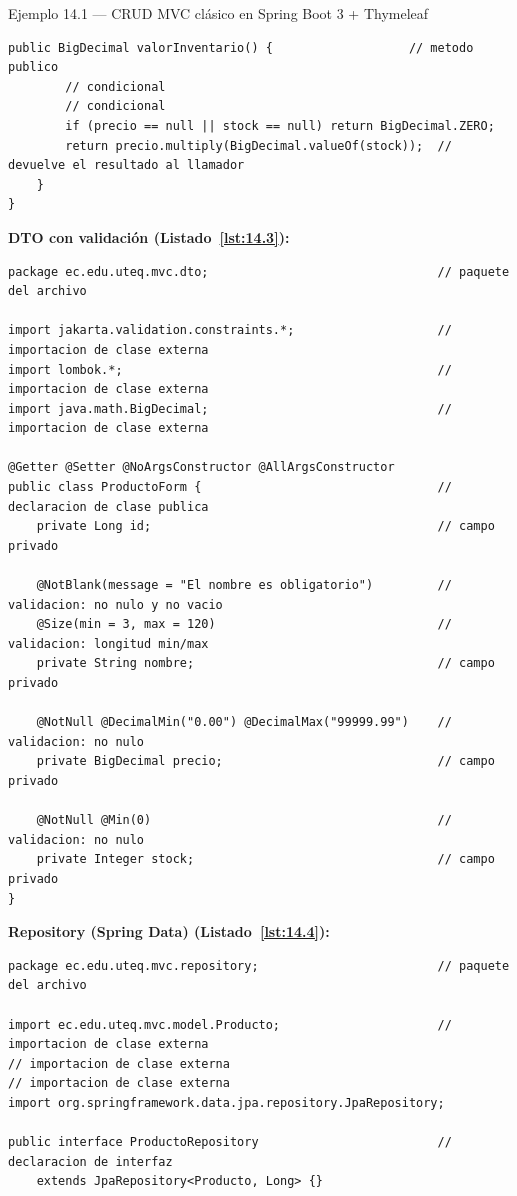 \documentclass[11pt,a4paper,openany]{book}
\begin{document}
\begin{cajaejemplo}{Ejemplo 14.1 --- CRUD MVC clásico en Spring Boot 3 + Thymeleaf}
\begin{lstlisting}[style=java,caption={Producto.java},label=lst:14.2]
    public BigDecimal valorInventario() {                   // metodo publico
        // condicional
        // condicional
        if (precio == null || stock == null) return BigDecimal.ZERO;
        return precio.multiply(BigDecimal.valueOf(stock));  // devuelve el resultado al llamador
    }
}
\end{lstlisting}

\textbf{DTO con validación (Listado~\ref{lst:14.3}):}
\begin{lstlisting}[style=java,caption={ProductoForm.java},label=lst:14.3]
package ec.edu.uteq.mvc.dto;                                // paquete del archivo

import jakarta.validation.constraints.*;                    // importacion de clase externa
import lombok.*;                                            // importacion de clase externa
import java.math.BigDecimal;                                // importacion de clase externa

@Getter @Setter @NoArgsConstructor @AllArgsConstructor
public class ProductoForm {                                 // declaracion de clase publica
    private Long id;                                        // campo privado

    @NotBlank(message = "El nombre es obligatorio")         // validacion: no nulo y no vacio
    @Size(min = 3, max = 120)                               // validacion: longitud min/max
    private String nombre;                                  // campo privado

    @NotNull @DecimalMin("0.00") @DecimalMax("99999.99")    // validacion: no nulo
    private BigDecimal precio;                              // campo privado

    @NotNull @Min(0)                                        // validacion: no nulo
    private Integer stock;                                  // campo privado
}
\end{lstlisting}

\textbf{Repository (Spring Data) (Listado~\ref{lst:14.4}):}
\begin{lstlisting}[style=java,caption={ProductoRepository.java},label=lst:14.4]
package ec.edu.uteq.mvc.repository;                         // paquete del archivo

import ec.edu.uteq.mvc.model.Producto;                      // importacion de clase externa
// importacion de clase externa
// importacion de clase externa
import org.springframework.data.jpa.repository.JpaRepository;

public interface ProductoRepository                         // declaracion de interfaz
    extends JpaRepository<Producto, Long> {}
\end{lstlisting}


\end{cajaejemplo}
\end{document}
